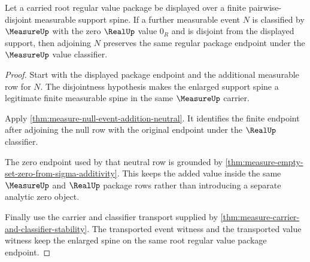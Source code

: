\begin{theorem}
\label{thm:measure-root-null-absorption-regularity}
Let a carried root regular value package be displayed over a finite
pairwise-disjoint measurable support spine. If a further measurable event
$N$ is classified by $\MeasureUp$ with the zero $\RealUp$ value $0_R$ and is
disjoint from the displayed support, then adjoining $N$ preserves the same
regular package endpoint under the $\MeasureUp$ value classifier.
\end{theorem}
\begin{proof}
Start with the displayed package endpoint and the additional measurable row
for $N$. The disjointness hypothesis makes the enlarged support spine a
legitimate finite measurable spine in the same $\MeasureUp$ carrier.

Apply \autoref{thm:measure-null-event-addition-neutral}. It identifies the
finite endpoint after adjoining the null row with the original endpoint under
the $\RealUp$ classifier.

The zero endpoint used by that neutral row is grounded by
\autoref{thm:measure-empty-set-zero-from-sigma-additivity}. This keeps the
added value inside the same $\MeasureUp$ and $\RealUp$ package rows rather
than introducing a separate analytic zero object.

Finally use the carrier and classifier transport supplied by
\autoref{thm:measure-carrier-and-classifier-stability}. The transported
event witness and the transported value witness keep the enlarged spine on
the same root regular value package endpoint.
\end{proof}

